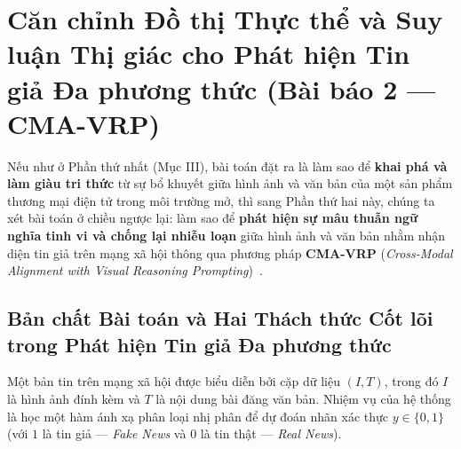 \documentclass[conference,10pt]{IEEEtran}
\begin{document}
\section{Căn chỉnh Đồ thị Thực thể và Suy luận Thị giác cho Phát hiện Tin giả Đa phương thức (Bài báo 2 --- CMA-VRP)}

Nếu như ở Phần thứ nhất (Mục III), bài toán đặt ra là làm sao để \textbf{khai phá và làm giàu tri thức} từ sự bổ khuyết giữa hình ảnh và văn bản của một sản phẩm thương mại điện tử trong môi trường mở, thì sang Phần thứ hai này, chúng ta xét bài toán ở chiều ngược lại: làm sao để \textbf{phát hiện sự mâu thuẫn ngữ nghĩa tinh vi và chống lại nhiễu loạn} giữa hình ảnh và văn bản nhằm nhận diện tin giả trên mạng xã hội thông qua phương pháp \textbf{CMA-VRP} (\textit{Cross-Modal Alignment with Visual Reasoning Prompting})~\cite{li2025cmavrp}.

\subsection{Bản chất Bài toán và Hai Thách thức Cốt lõi trong Phát hiện Tin giả Đa phương thức}

Một bản tin trên mạng xã hội được biểu diễn bởi cặp dữ liệu $(I, T)$, trong đó $I$ là hình ảnh đính kèm và $T$ là nội dung bài đăng văn bản. Nhiệm vụ của hệ thống là học một hàm ánh xạ phân loại nhị phân để dự đoán nhãn xác thực $y \in \{0, 1\}$ (với $1$ là tin giả --- \textit{Fake News} và $0$ là tin thật --- \textit{Real News}).
\end{document}
